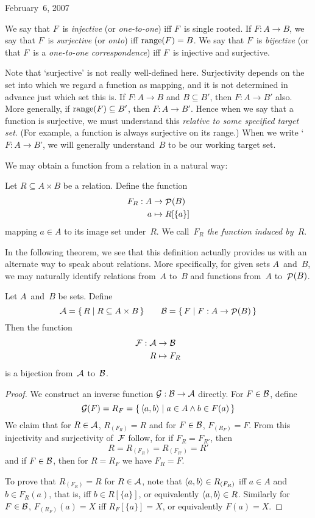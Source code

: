 \begin{lecture}{February~6, 2007}
\begin{defn}
We say that \(F\)~is \emph{injective} (or \emph{one-to-one}) iff \(F\)~is single rooted. If \(F:A\to B\), we say that \(F\)~is \emph{surjective} (or \emph{onto}) iff \(\operatorname{range}(F)=B\). We say that \(F\)~is \emph{bijective} (or that \(F\)~is a \emph{one-to-one correspondence}) iff \(F\)~is injective and surjective.
\end{defn}
\begin{rmk}
Note that `surjective' is not really well-defined here. Surjectivity depends on the set into which we regard a function as mapping, and it is not determined in advance just which set this is. If \(F:A\to B\) and \(B\subseteq B'\), then \(F:A\to B'\) also. More generally, if \(\operatorname{range}(F)\subseteq B'\), then \(F:A\to B'\). Hence when we say that a function is surjective, we must understand this \emph{relative to some specified target set}. (For example, a function is always surjective on its range.) When we write `\(F:A\to B\)', we will generally understand~\(B\) to be our working target set.
\end{rmk}

We may obtain a function from a relation in a natural way:
\begin{defn}
Let \(R\subseteq A\times B\) be a relation. Define the function
\begin{align*}
F_R:A&\to\mathop{\mathcal{P}}(B)\\
	a&\mapsto R[\{a\}]
\end{align*}
mapping \(a\in A\) to its image set under~\(R\). We call~\(F_R\) \emph{the function induced by~\(R\)}.
\end{defn}
\noindent In the following theorem, we see that this definition actually provides us with an alternate way to speak about relations. More specifically, for given sets \(A\)~and~\(B\), we may naturally identify relations from~\(A\) to~\(B\) and functions from~\(A\) to~\(\mathop{\mathcal{P}}(B)\).
\begin{thm}
Let \(A\)~and~\(B\) be sets. Define
\[\mathcal{A}=\{\,R\mid R\subseteq A\times B\,\}\qquad\mathcal{B}=\{\,F\mid F:A\to\mathop{\mathcal{P}}(B)\,\}\]
Then the function
\begin{align*}
\mathcal{F}:\mathcal{A}&\to\mathcal{B}\\
	R&\mapsto F_R
\end{align*}
is a bijection from~\(\mathcal{A}\) to~\(\mathcal{B}\).
\end{thm}
\begin{proof}
We construct an inverse function \(\mathcal{G}:\mathcal{B}\to\mathcal{A}\) directly. For \(F\in\mathcal{B}\), define
\[\mathcal{G}(F)=R_F=\{\,\langle{a},{b}\rangle\mid a\in A\land b\in F(a)\,\}\]
We claim that for \(R\in\mathcal{A}\), \(R_{(F_R)}=R\) and for \(F\in\mathcal{B}\), \(F_{(R_F)}=F\). From this injectivity and surjectivity of~\(\mathcal{F}\) follow, for if \(F_R=F_{R'}\), then
\[R=R_{(F_R)}=R_{(F_{R'})}=R'\]
and if \(F\in\mathcal{B}\), then for \(R=R_F\) we have \(F_R=F\).

To prove that \(R_{(F_R)}=R\) for \(R\in\mathcal{A}\), note that \(\langle{a},{b}\rangle\in R_{(F_R)}\) iff \(a\in A\) and \(b\in F_R(a)\), that is, iff \(b\in R[\{a\}]\), or equivalently \(\langle{a},{b}\rangle\in R\). Similarly for \(F\in\mathcal{B}\), \(F_{(R_F)}(a)=X\) iff \(R_F[\{a\}]=X\), or equivalently \(F(a)=X\).
\end{proof}
\end{lecture}
